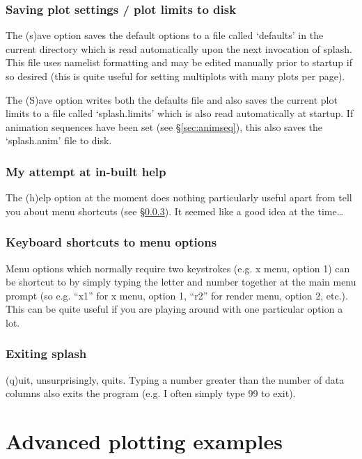 \documentclass[a4paper,11pt]{article}
\begin{document}
\subsubsection{ Saving plot settings / plot limits to disk}
 The (s)ave option saves the default options to a file called `defaults' in the
current directory which is read automatically upon the next invocation of
splash. This file uses namelist formatting and may be edited manually prior to  
startup if so desired (this is quite useful for setting multiplots with many plots per
 page).
 
  The (S)ave option writes both the defaults file and also saves the current plot
limits to a file called `splash.limits' which is also read automatically
at startup. If animation sequences have been set (see \S\ref{sec:animseq}), this also saves the `splash.anim' file to disk.

\subsubsection{ My attempt at in-built help}
The (h)elp option at the moment does nothing particularly useful apart from tell you about menu shortcuts (see \S\ref{sec:menushortcuts}). It seemed like a good idea at the time\ldots

\subsubsection{ Keyboard shortcuts to menu options}
\label{sec:menushortcuts}
Menu options which normally require two keystrokes (e.g. x menu, option 1) can be shortcut to by simply typing the letter and number together at the main menu prompt (so e.g. ``x1'' for x menu, option 1, ``r2'' for render menu, option 2, etc.). This can be quite useful if you are playing around with one particular option a lot.

\subsubsection{ Exiting splash}
 (q)uit, unsurprisingly, quits. Typing a number greater than the number of
data columns also exits the program (e.g. I often simply type 99 to exit).


\section{Advanced plotting examples}
\end{document}
